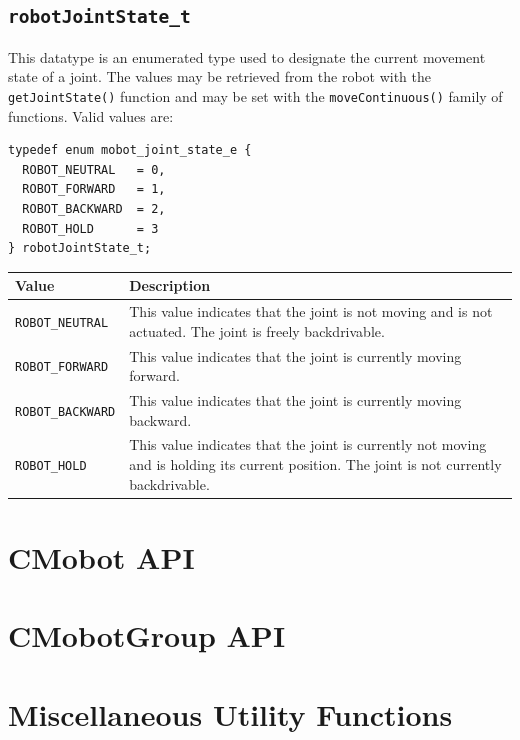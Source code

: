 \documentclass{article}
\begin{document}
\subsection{\label{sec:robotJointState_t}\texttt{robotJointState\_t}}
This datatype is an enumerated type used to designate the current 
movement state of a joint. The values may be retrieved from the 
robot with the \texttt{getJointState()} function and may be set 
with the \texttt{moveContinuous()} family of functions. Valid values are:

\begin{verbatim}
typedef enum mobot_joint_state_e {
  ROBOT_NEUTRAL   = 0,
  ROBOT_FORWARD   = 1,
  ROBOT_BACKWARD  = 2,
  ROBOT_HOLD      = 3
} robotJointState_t;
\end{verbatim}

\begin{tabular}{p{3.3cm}p{11.5cm}} \hline 
Value & Description \\
\hline
\texttt{ROBOT\_NEUTRAL}& This value indicates that the joint is not moving and is not actuated. The joint is freely backdrivable. \\
\texttt{ROBOT\_FORWARD}& This value indicates that the joint is currently moving forward. \\
\texttt{ROBOT\_BACKWARD}& This value indicates that the joint is currently moving backward. \\
\texttt{ROBOT\_HOLD}& This value indicates that the joint is currently not moving and is holding its current position. The joint is not currently backdrivable. \\
\hline
\end{tabular}

\section{\label{sec:cmobot_api}CMobot API}


\section{\label{sec:cmobotgroup_api}CMobotGroup API}


\section{\label{sec:utility_functions}Miscellaneous Utility Functions}

\printindex
\end{document}
